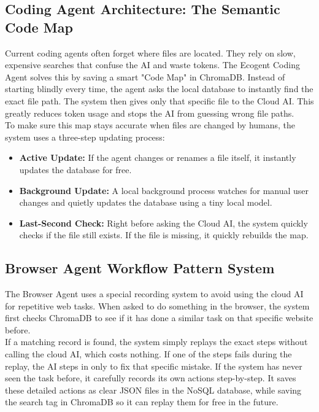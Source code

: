 \subsection{Coding Agent Architecture: The Semantic Code Map}
Current coding agents often forget where files are located. They rely on slow, expensive searches that confuse the AI and waste tokens. The Ecogent Coding Agent solves this by saving a smart "Code Map" in ChromaDB. Instead of starting blindly every time, the agent asks the local database to instantly find the exact file path. The system then gives only that specific file to the Cloud AI. This greatly reduces token usage and stops the AI from guessing wrong file paths.\\

To make sure this map stays accurate when files are changed by humans, the system uses a three-step updating process:
\begin{itemize}
    \item \textbf{Active Update:} If the agent changes or renames a file itself, it instantly updates the database for free.
    \item \textbf{Background Update:} A local background process watches for manual user changes and quietly updates the database using a tiny local model.
    \item \textbf{Last-Second Check:} Right before asking the Cloud AI, the system quickly checks if the file still exists. If the file is missing, it quickly rebuilds the map.
\end{itemize}

\subsection{Browser Agent Workflow Pattern System}
The Browser Agent uses a special recording system to avoid using the cloud AI for repetitive web tasks. When asked to do something in the browser, the system first checks ChromaDB to see if it has done a similar task on that specific website before.\\

If a matching record is found, the system simply replays the exact steps without calling the cloud AI, which costs nothing. If one of the steps fails during the replay, the AI steps in only to fix that specific mistake. If the system has never seen the task before, it carefully records its own actions step-by-step. It saves these detailed actions as clear JSON files in the NoSQL database, while saving the search tag in ChromaDB so it can replay them for free in the future.\\

